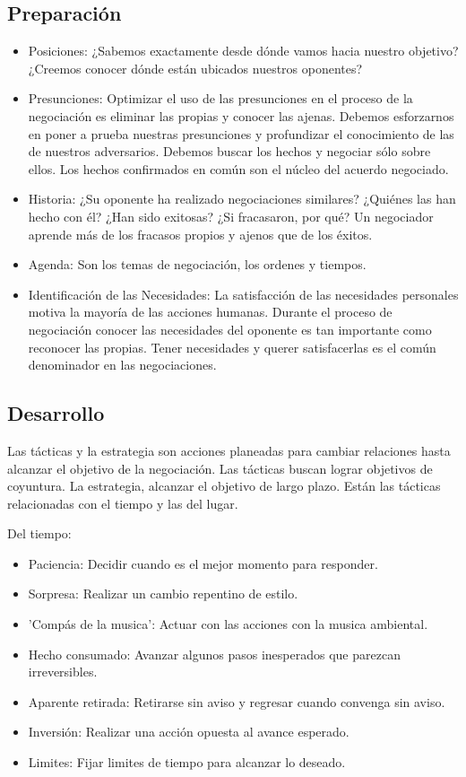 \documentclass[titlepage,a4paper]{article}
\begin{document}
\subsection*{Preparación}
\begin{itemize}
    \item Posiciones: ¿Sabemos exactamente desde dónde vamos hacia nuestro objetivo? ¿Creemos conocer dónde están ubicados nuestros oponentes?
    \item Presunciones: Optimizar el uso de las presunciones en el proceso de la negociación es eliminar las propias y conocer las ajenas. Debemos esforzarnos en poner a prueba nuestras presunciones y profundizar el conocimiento de las de nuestros adversarios. Debemos buscar los hechos y negociar sólo sobre ellos. Los hechos confirmados en común son el núcleo del acuerdo negociado.
    \item Historia:  ¿Su oponente ha realizado negociaciones similares? ¿Quiénes las han hecho con él? ¿Han sido exitosas? ¿Si fracasaron, por qué? Un negociador aprende más de los fracasos propios y ajenos que de los éxitos.
    \item Agenda: Son los temas de negociación, los ordenes y tiempos.
    \item Identificación de las Necesidades: La satisfacción de las necesidades personales motiva la mayoría de las acciones humanas. Durante el proceso de negociación conocer las necesidades del oponente es tan importante como reconocer las propias. Tener necesidades y querer satisfacerlas es el común denominador en las negociaciones.
\end{itemize}

\subsection*{Desarrollo}
Las tácticas y la estrategia son acciones planeadas para cambiar relaciones hasta alcanzar el objetivo
de la negociación. Las tácticas buscan lograr objetivos de coyuntura. La estrategia, alcanzar el objetivo
de largo plazo. Están las tácticas relacionadas con el tiempo y las del lugar.

Del tiempo:
\begin{itemize}
    \item Paciencia: Decidir cuando es el mejor momento para responder.
    \item Sorpresa: Realizar un cambio repentino de estilo.
    \item 'Compás de la musica': Actuar con las acciones con la musica ambiental.
    \item Hecho consumado:  Avanzar algunos pasos inesperados que parezcan irreversibles.
    \item Aparente retirada: Retirarse sin aviso y regresar cuando convenga sin aviso.
    \item Inversión: Realizar una acción opuesta al avance esperado.
    \item Limites: Fijar limites de tiempo para alcanzar lo deseado.
\end{itemize}
\end{document}
